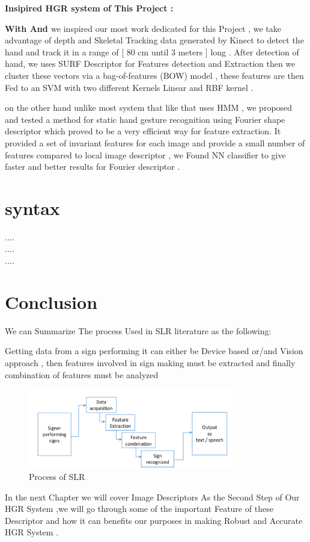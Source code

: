 \textbf{ Insipired HGR system  of This Project : }


\textbf{With \cite{dardas} And \cite{47} } we inspired our most work dedicated for this Project , we take advantage of  depth and Skeletal Tracking  data generated by Kinect to detect the hand and track it  in a range of [ 80 cm until 3 meters ] long  .
After detection of hand, we uses SURF Descriptor for Features detection and Extraction then we  cluster these vectors via a bag-of-features (BOW) model , these features are then Fed to an SVM with two different Kernels Linear and RBF kernel .

on the other hand unlike most system that like \cite{33} that uses HMM ,  we proposed and tested a method for static hand gesture recognition using  Fourier shape  descriptor which proved to be a very efficient way for feature extraction. It provided a set of invariant features for each image and provide  a small number of features compared to local image descriptor  , we Found NN classifier to give faster and better results for Fourier descriptor .


\section{syntax}

....
\\
....
\\
....


\newpage
\section{Conclusion}

We can Summarize The process Used in SLR literature as the following:

Getting data from a sign performing  it can either be Device based or/and Vision approach , then features
involved in sign making must be extracted and finally combination of features must be analyzed 

\begin{figure}[H]
\centering
\includegraphics[width=0.8\textwidth]{img/SLR.PNG}
\caption{  Process of SLR }
\label{fig:SLR}
\end{figure}

In the next Chapter we will cover Image Descriptors As the Second Step of Our HGR System ,we will go through some of the important Feature of these Descriptor and how it can benefits our purposes in making Robust and Accurate HGR System . 